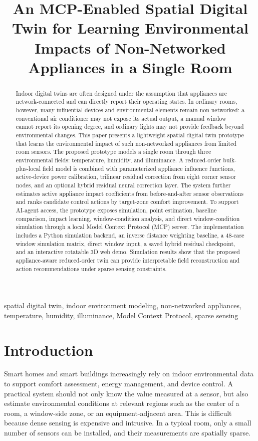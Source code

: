 \documentclass[conference]{IEEEtran}
\title{An MCP-Enabled Spatial Digital Twin for Learning Environmental Impacts of Non-Networked Appliances in a Single Room}
\author{
\IEEEauthorblockN{Yun-Yu Lin}
\IEEEauthorblockA{
Department of Computer Science and Information Engineering\\
National Changhua University of Education\\
Changhua, Taiwan\\
email@example.com}
\and
\IEEEauthorblockN{Chang-Pei Yi}
\IEEEauthorblockA{
Department of Computer Science and Information Engineering\\
National Changhua University of Education\\
Changhua, Taiwan\\
advisor@example.com}
}
\begin{document}
\maketitle

\begin{abstract}
Indoor digital twins are often designed under the assumption that appliances are network-connected and can directly report their operating states. In ordinary rooms, however, many influential devices and environmental elements remain non-networked: a conventional air conditioner may not expose its actual output, a manual window cannot report its opening degree, and ordinary lights may not provide feedback beyond environmental changes. This paper presents a lightweight spatial digital twin prototype that learns the environmental impact of such non-networked appliances from limited room sensors. The proposed prototype models a single room through three environmental fields: temperature, humidity, and illuminance. A reduced-order bulk-plus-local field model is combined with parameterized appliance influence functions, active-device power calibration, trilinear residual correction from eight corner sensor nodes, and an optional hybrid residual neural correction layer. The system further estimates active appliance impact coefficients from before-and-after sensor observations and ranks candidate control actions by target-zone comfort improvement. To support AI-agent access, the prototype exposes simulation, point estimation, baseline comparison, impact learning, window-condition analysis, and direct window-condition simulation through a local Model Context Protocol (MCP) server. The implementation includes a Python simulation backend, an inverse distance weighting baseline, a 48-case window simulation matrix, direct window input, a saved hybrid residual checkpoint, and an interactive rotatable 3D web demo. Simulation results show that the proposed appliance-aware reduced-order twin can provide interpretable field reconstruction and action recommendations under sparse sensing constraints.
\end{abstract}

\begin{IEEEkeywords}
spatial digital twin, indoor environment modeling, non-networked appliances, temperature, humidity, illuminance, Model Context Protocol, sparse sensing
\end{IEEEkeywords}

\section{Introduction}
Smart homes and smart buildings increasingly rely on indoor environmental data to support comfort assessment, energy management, and device control. A practical system should not only know the value measured at a sensor, but also estimate environmental conditions at relevant regions such as the center of a room, a window-side zone, or an equipment-adjacent area. This is difficult because dense sensing is expensive and intrusive. In a typical room, only a small number of sensors can be installed, and their measurements are spatially sparse.
\end{document}
